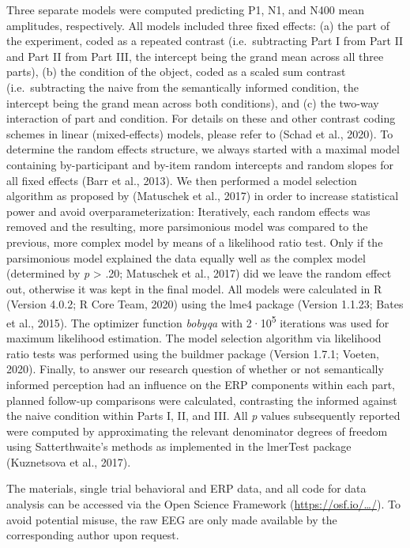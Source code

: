 \documentclass[
  english,
  man,11pt,floatsintext]{apa7}
\begin{document}
Three separate models were computed predicting P1, N1, and N400 mean amplitudes, respectively. All models included three fixed effects: (a) the part of the experiment, coded as a repeated contrast (i.e.~subtracting Part I from Part II and Part II from Part III, the intercept being the grand mean across all three parts), (b) the condition of the object, coded as a scaled sum contrast (i.e.~subtracting the naive from the semantically informed condition, the intercept being the grand mean across both conditions), and (c) the two-way interaction of part and condition. For details on these and other contrast coding schemes in linear (mixed-effects) models, please refer to (Schad et al., 2020). To determine the random effects structure, we always started with a maximal model containing by-participant and by-item random intercepts and random slopes for all fixed effects (Barr et al., 2013). We then performed a model selection algorithm as proposed by (Matuschek et al., 2017) in order to increase statistical power and avoid overparameterization: Iteratively, each random effects was removed and the resulting, more parsimonious model was compared to the previous, more complex model by means of a likelihood ratio test. Only if the parsimonious model explained the data equally well as the complex model (determined by \emph{p} \textgreater{} .20; Matuschek et al., 2017) did we leave the random effect out, otherwise it was kept in the final model. All models were calculated in R (Version 4.0.2; R Core Team, 2020) using the lme4 package (Version 1.1.23; Bates et al., 2015). The optimizer function \emph{bobyqa} with 2·10\textsuperscript{5} iterations was used for maximum likelihood estimation. The model selection algorithm via likelihood ratio tests was performed using the buildmer package (Version 1.7.1; Voeten, 2020). Finally, to answer our research question of whether or not semantically informed perception had an influence on the ERP components within each part, planned follow-up comparisons were calculated, contrasting the informed against the naive condition within Parts I, II, and III. All \emph{p} values subsequently reported were computed by approximating the relevant denominator degrees of freedom using Satterthwaite's methods as implemented in the lmerTest package (Kuznetsova et al., 2017).

The materials, single trial behavioral and ERP data, and all code for data analysis can be accessed via the Open Science Framework (\href{https://osf.io/myprojects/}{https://osf.io/\ldots/}). To avoid potential misuse, the raw EEG are only made available by the corresponding author upon request.
\end{document}
